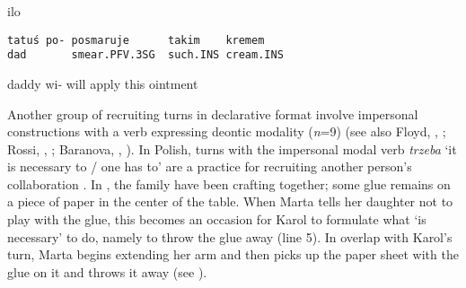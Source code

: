\documentclass[output=paper]{langsci/langscibook}
\begin{document}
\vspace{-1mm}
%
\begin{mdframednoverticalspace}[style=firstfoc]
\begin{transbox}{1}{ilo}
\begin{verbatim}
tatuś po- posmaruje      takim    kremem
dad       smear.PFV.3SG  such.INS cream.INS
\end{verbatim}
daddy wi- will apply this ointment
\end{transbox}
\end{mdframednoverticalspace}
%
\begin{mdframednoverticalspace}[style=secondfoc]
\end{mdframednoverticalspace}

Another group of recruiting turns in declarative format involve impersonal constructions with a verb expressing deontic modality (\textit{n}=9) (see also Floyd, , ; Rossi, , ; Baranova, , ).  In Polish, turns with the impersonal modal verb \textit{trzeba} ‘it is necessary to / one has to’ are a practice for recruiting another person’s collaboration \citep{ZinkenOgiermann2011}.  In , the family have been crafting together; some glue remains on a piece of paper in the center of the table.  When Marta tells her daughter not to play with the glue, this becomes an occasion for Karol to formulate what `is necessary' to do, namely to throw the glue away (line 5).  In overlap with Karol’s turn, Marta begins extending her arm and then picks up the paper sheet with the glue on it and throws it away (see \citealt[chap. 6]{Zinken2016}).
\end{document}
